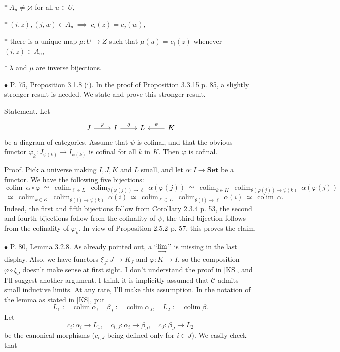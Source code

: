 \documentclass[12pt]{article}
\theoremstyle{remark}
\newcommand{\bu}{\bullet}
\newcommand{\n}{\noindent}
\newcommand{\C}{\mathcal C}
\newcommand{\Set}{\textbf{Set}}
\newcommand{\p}{\varphi}
\newcommand{\colim}{\operatornamewithlimits{\underset{\longrightarrow}{lim}}}
\DeclareMathOperator*{\coli}{colim}
\begin{document}
\n$*\ A_u\ne\varnothing$ for all $u\in U$,

\n$*\ (i,z),(j,w)\in A_u\ \implies\ c_i(z)=c_j(w)$, 

\n$*$ there is a unique map $\mu:U\to Z$ such that $\mu(u)=c_i(z)$ whenever $(i,z)\in A_u$,

\n$*\ \lambda$ and $\mu$ are inverse bijections.


\n$\bu$ P. 75, Proposition 3.1.8 (i). In the proof of Proposition 3.3.15 p. 85, a slightly stronger result is needed. We state and prove this stronger result.

Statement. Let 
$$
\begin{tikzcd}
J\ar{r}{\p}&I\ar{r}{\theta}&L&K\ar{l}[swap]{\psi}
\end{tikzcd}
$$
be a diagram of categories. Assume that $\psi$ is cofinal, and that the obvious functor $\p_k:J_{\psi(k)}\to I_{\psi(k)}$ is cofinal for all $k$ in $K$. Then $\p$ is cofinal. 

Proof. Pick a universe making $I,J,K$ and $L$ small, and let $\alpha:I\to\Set$ be a functor. We have the following five bijections:
$$
\coli\ \alpha\circ\p\ \simeq\ 
%
\coli_{\ell\in L}\ \coli_{\theta(\p(j))\to\ell}\ \alpha(\p(j))\ \simeq\ 
%
\coli_{k\in K}\ \coli_{\theta(\p(j))\to\psi(k)}\ \alpha(\p(j))
$$
$$
\ \simeq\ \coli_{k\in K}\ \coli_{\theta(i)\to\psi(k)}\ \alpha(i)\ \simeq\ 
%
\coli_{\ell\in L}\ \coli_{\theta(i)\to\ell}\ \alpha(i)\ \simeq\ 
%
\coli\ \alpha.
$$
Indeed, the first and fifth bijections follow from Corollary 2.3.4 p. 53, the second and fourth bijections follow from the cofinality of $\psi$, the third bijection follows from the cofinality of $\p_k$. In view of Proposition 2.5.2 p. 57, this proves the claim.  


\n$\bu$ P. 80, Lemma 3.2.8. As already pointed out, a ``$\displaystyle\colim$'' is missing in the last display. Also, we have functors $\xi_J:J\to K_J$ and $\varphi:K\to I$, so the composition $\varphi\circ\xi_J$ doesn't make sense at first sight. I don't understand the proof in [KS], and I'll suggest another argument. I think it is implicitly assumed that $\C$ admits small inductive limits. At any rate, I'll make this assumption. In the notation of the lemma as stated in [KS], put 
$$
L_1:=\coli\alpha,\quad
\beta_J:=\coli\alpha_J,\quad
L_2:=\coli\beta.
$$
Let 
$$
c_i:\alpha_i\to L_1,\quad 
c_{i,J}:\alpha_i\to\beta_J,\quad 
c_J:\beta_J\to L_2
$$
be the canonical morphisms ($c_{i,J}$ being defined only for $i\in J$). We easily check that 
\end{document}
